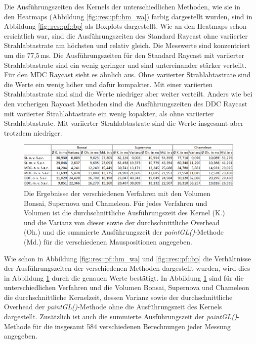 Die Ausführungszeiten des Kernels der unterschiedlichen Methoden, wie sie in den Heatmaps (Abbildung \ref{fig::res::pf::hm_wa}) farbig dargestellt wurden, sind in Abbildung \ref{fig::res::pf::bp} als Boxplots dargestellt.
Wie an den Heatmaps schon ersichtlich war, sind die Ausführungszeiten des Standard Raycast ohne variierter Strahlabtastrate am höchsten und relativ gleich.
Die Messwerte sind konzentriert um die 77,5\,ms.
Die Ausführungszeiten für den Standard Raycast mit variierter Strahlabtastrate sind ein wenig geringer und sind untereinander stärker verteilt.
Für den MDC Raycast sieht es ähnlich aus.
Ohne variierter Strahlabtastrate sind die Werte ein wenig höher und dafür kompakter.
Mit einer variierten Strahlabtastrate sind sind die Werte niedriger aber weiter verteilt.
Anders wie bei den vorherigen Raycast Methoden sind die Ausführungszeiten des DDC Raycast mit variierter Strahlabtastrate ein wenig kopakter, als ohne variierter Strahlabtastrate.
Mit variierter Strahlabtastrate sind die Werte insgesamt aber trotzdem niedriger.

\begin{figure}
	\centering
	\includegraphics[width=1\textwidth]{../../Neue_Messungen/Messungen_in_Tabelle.PNG}
	\caption{Die Ergebnisse der verschiedenen Verfahren mit den Volumen Bonsai, Supernova und Chameleon. Für jedes Verfahren und Volumen ist die durchschnittliche Ausführungszeit des Kernel (K.) und die Varianz von dieser sowie der durchschnittliche Overhead (Oh.) und die summierte Ausführungszeit der \emph{paintGL()}-Methode (Md.) für die verschiedenen Mauspositionen angegeben.}
	\label{fig::res::pf::table}
\end{figure}

Wie schon in Abbildung \ref{fig::res::pf::hm_wa} und \ref{fig::res::pf::bp} die Verhältnisse der Ausführungszeiten der verschiedenen Methoden dargestellt wurden, wird dies in Abbildung \ref{fig::res::pf::table} durch die genauen Werte bestätigt.
In Abbildung \ref{fig::res::pf::table} sind für die unterschiedlichen Verfahren und die Volumen Bonsai, Supernova und Chameleon die durchschnittliche Kernelzeit, dessen Varianz sowie der durchschnittliche Overhead der \emph{paintGL()}-Methode ohne die Ausführungszeit des Kernels dargestellt.
Zusätzlich ist auch die summierte Ausführungszeit der \emph{paintGL()}-Methode für die insgesamt 584 verschiedenen Berechnungen jeder Messung angegeben.

